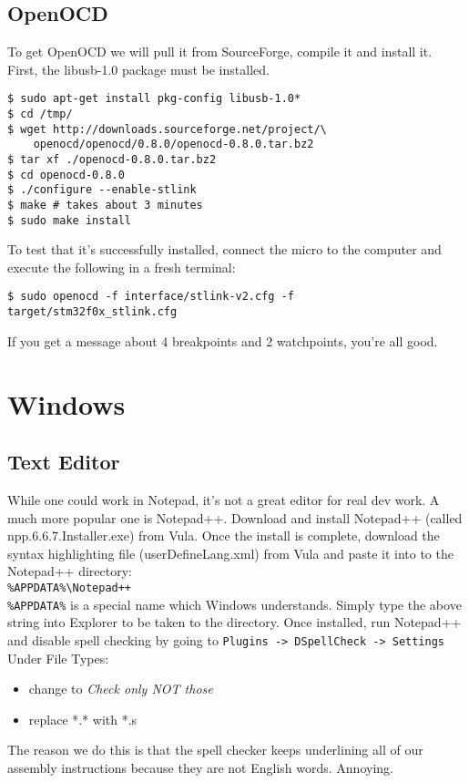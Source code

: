 \subsection{OpenOCD}
To get OpenOCD we will pull it from SourceForge, compile it and install it. First, the libusb-1.0 package must be installed.
\begin{lstlisting}[style=BashStyle]
$ sudo apt-get install pkg-config libusb-1.0*
$ cd /tmp/
$ wget http://downloads.sourceforge.net/project/\
    openocd/openocd/0.8.0/openocd-0.8.0.tar.bz2
$ tar xf ./openocd-0.8.0.tar.bz2 
$ cd openocd-0.8.0
$ ./configure --enable-stlink
$ make # takes about 3 minutes
$ sudo make install
\end{lstlisting}
To test that it's successfully installed, connect the micro to the computer and execute the following in a fresh terminal:
\begin{lstlisting}[style=BashStyle]
$ sudo openocd -f interface/stlink-v2.cfg -f target/stm32f0x_stlink.cfg
\end{lstlisting}
If you get a message about 4 breakpoints and 2 watchpoints, you're all good.

\section{Windows}
\subsection{Text Editor}
While one could work in Notepad, it's not a great editor for real dev work. A much more popular one is Notepad++. Download and install Notepad++ (called npp.6.6.7.Installer.exe) from Vula. 
Once the install is complete, download the syntax highlighting file (userDefineLang.xml) from Vula and paste it into to the Notepad++ directory: \\
\verb;%APPDATA%\Notepad++;\\
\verb+%APPDATA%+ is a special name which Windows understands. Simply type the above string into Explorer to be taken to the directory. 
Once installed, run Notepad++ and disable spell checking by going to \verb+Plugins -> DSpellCheck -> Settings+
Under File Types:
\begin{itemize}
\item change to \textit{Check only NOT those}
\item replace   *.*   with   *.s
\end{itemize}
The reason we do this is that the spell checker keeps underlining all of our assembly instructions because they are not English words. Annoying.

